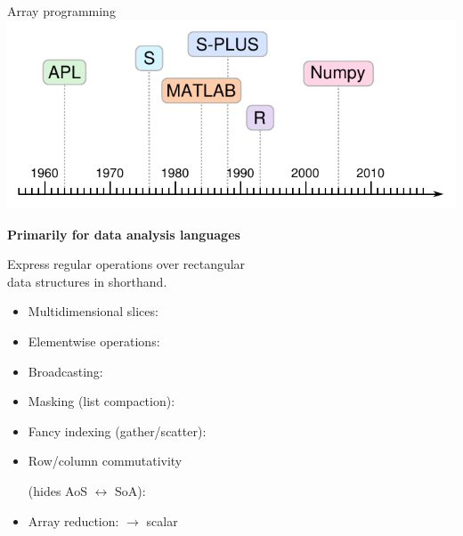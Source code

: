 \documentclass[aspectratio=169]{beamer}
\begin{document}
\begin{frame}[fragile]{Array programming}
\vspace{0.2 cm}
\hfill \includegraphics[height=2.75 cm]{apl-timeline.pdf}

\vspace{-2.15 cm}
{\bf\large Primarily for data analysis languages}

\vspace{0.5 cm}
Express regular operations over rectangular \\ data structures in shorthand.

\vspace{0.25 cm}
\begin{itemize}\setlength{\itemsep}{0.15 cm}
\item<2-> Multidimensional slices: 
\item<3-> Elementwise operations: 
\item<4-> Broadcasting: 
\item<5-> Masking (list compaction): 
\item<6-> Fancy indexing (gather/scatter): 
\item<7-> Row/column commutativity 

(hides AoS $\leftrightarrow$ SoA): 
\item<8-> Array reduction:  $\to$ scalar
\end{itemize}
\end{frame}
\end{document}
